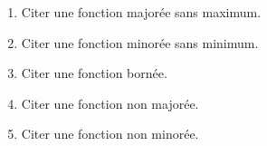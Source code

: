 
\begin{enumerate}
\item Citer une fonction majorée sans maximum.
\item Citer une fonction minorée sans minimum.
\item Citer une fonction bornée.
\item Citer une fonction non majorée.
\item Citer une fonction non minorée.
\end{enumerate}
